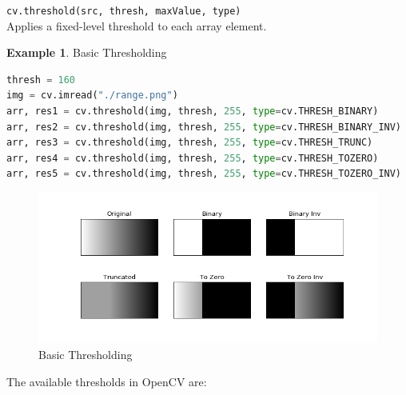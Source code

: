 \documentclass{article}
\theoremstyle{definition}
\newtheorem{ex}{Example}[subsection]
\theoremstyle{remark}
\newcommand{\func}[2]{\noindent\lstinline{#1}\\#2}
\begin{document}
\func{cv.threshold(src, thresh, maxValue, type)}{Applies a fixed-level threshold to each array element.}

\begin{ex} Basic Thresholding
\begin{lstlisting}[language=Python]
thresh = 160
img = cv.imread("./range.png")
arr, res1 = cv.threshold(img, thresh, 255, type=cv.THRESH_BINARY) 
arr, res2 = cv.threshold(img, thresh, 255, type=cv.THRESH_BINARY_INV) 
arr, res3 = cv.threshold(img, thresh, 255, type=cv.THRESH_TRUNC) 
arr, res4 = cv.threshold(img, thresh, 255, type=cv.THRESH_TOZERO) 
arr, res5 = cv.threshold(img, thresh, 255, type=cv.THRESH_TOZERO_INV) 
\end{lstlisting}
\begin{figure}[h!]
    \centering
    \includegraphics[width=\textwidth]{ocv_ith_basic}
    \caption{Basic Thresholding}
    \label{fig:ocv_ith_bas}
\end{figure}
\end{ex}

The available thresholds in OpenCV are:
\end{document}
